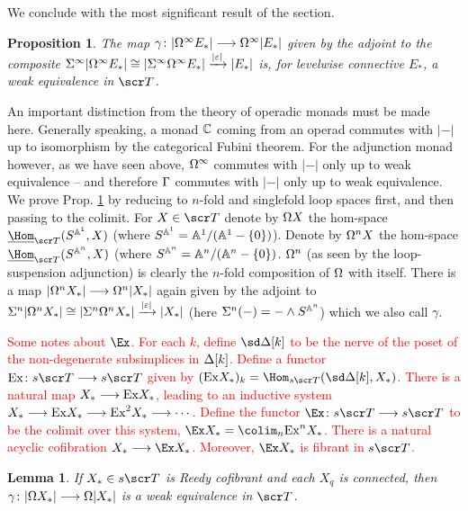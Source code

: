 \documentclass{amsart}
\newtheorem{prop}{Proposition}[section]
\newtheorem{lem}{Lemma}[thm]
\theoremstyle{definition}
\begin{document}
We conclude with the most significant result of the section. 
\begin{prop}\label{prop:3.5}
The map $\gamma \colon |\Omega^{\infty} E_*| \longrightarrow \Omega^{\infty}|E_*|$ given by the adjoint to the composite $\Sigma^{\infty}|\Omega^{\infty}E_*| \cong |\Sigma^{\infty} \Omega^{\infty}E_*| \xrightarrow{|\varepsilon|} |E_*|$ is, for levelwise connective $E_*$, a weak equivalence in $\sT$.
\end{prop}

An important distinction from the theory of operadic monads must be made here. Generally speaking, a monad $\mathbb{C}$ coming from an operad commutes with $|-|$ up to isomorphism by the categorical Fubini theorem. For the adjunction monad however, as we have seen above, $\Omega^{\infty}$ commutes with $|-|$ only up to weak equivalence -- and therefore $\Gamma$ commutes with $|-|$ only up to weak equivalence.\\

We prove Prop. \ref{prop:3.5} by reducing to $n$-fold and singlefold loop spaces first, and then passing to the colimit. For $X \in \sT$ denote by $\Omega X$ the hom-space $\underline{\Hom}_{\sT}(S^{\bA^1},X)$ (where $S^{\mathbb{A}^1} = \mathbb{A}^1/(\mathbb{A}^1 - \{0\})$). Denote by $\Omega^n X$ the hom-space $\underline{\Hom}_{\sT}(S^{\bA^n},X)$ (where $S^{\mathbb{A}^n} = \mathbb{A}^n/(\mathbb{A}^n-\{0\})$. $\Omega^n$ (as seen by the loop-suspension adjunction) is clearly the $n$-fold composition of $\Omega$ with itself. There is a map $|\Omega^n X_*| \longrightarrow \Omega^n|X_*|$ again given by the adjoint to $\Sigma^n|\Omega^n X_*| \cong |\Sigma^n\Omega^n X_*| \xrightarrow{|\varepsilon|} |X_*|$ (here $\Sigma^n(-) = - \wedge S^{\mathbb{A}^n}$) which we also call $\gamma$.

\textcolor{red}{
Some notes about $\Ex$. For each $k$, define $\sd \DE[k]$ to be the nerve of the poset of the non-degenerate subsimplices in $\Delta[k]$. Define a functor $\mathrm{Ex} \colon s\sT \rtarr s\sT$ given by $(\mathrm{Ex}X_*)_k = \Hom_{s\sT} (\sd \DE[k], X_*)$. There is a natural map $X_* \longrightarrow \mathrm{Ex} X_*$, leading to an inductive system $X_* \longrightarrow \mathrm{Ex} X_* \longrightarrow \mathrm{Ex}^2 X_* \longrightarrow \cdots$. Define the functor $\Ex \colon s\sT \rtarr s\sT$ to be the colimit over this system, $\Ex X_* = \colim_n \mathrm{Ex}^n X_*$. There is a natural acyclic cofibration $X_* \rtarr \Ex X_*$. Moreover, $\Ex X_*$ is fibrant in $s\sT$. 
}

\begin{lem}\label{lem:3.1}
If $X_* \in s\sT$ is Reedy cofibrant and each $X_q$ is connected, then $\gamma \colon |\Omega X_*| \longrightarrow \Omega|X_*|$ is a weak equivalence in $\sT$.
\end{lem}
\end{document}
